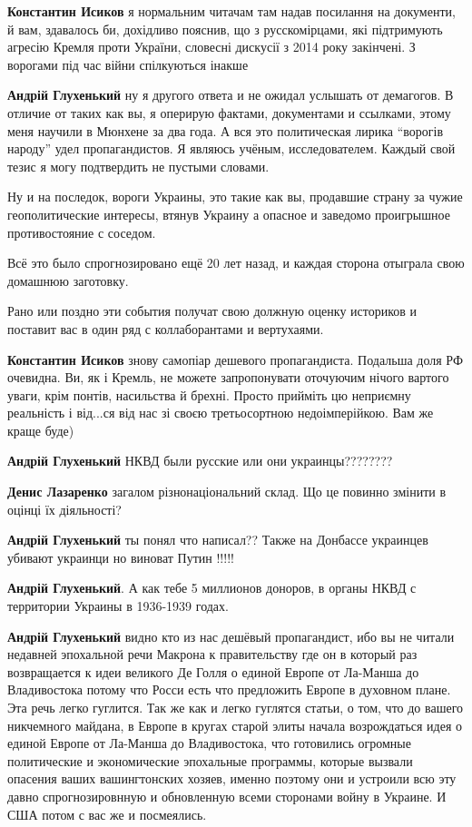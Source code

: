 \begin{itemize}
\begin{itemize}
\textbf{Константин Исиков} я нормальним читачам там надав посилання на
документи, й вам, здавалось би, дохідливо пояснив, що з русскомірцами, які
підтримують агресію Кремля проти України, словесні дискусії з 2014 року
закінчені. З ворогами під час війни спілкуються інакше


\textbf{Андрій Глухенький} ну я другого ответа и не ожидал услышать от
демагогов. В отличие от таких как вы, я оперирую фактами, документами и
ссылками, этому меня научили в Мюнхене за два года. А вся это политическая
лирика \enquote{ворогів народу} удел пропагандистов. Я являюсь учёным,
исследователем. Каждый свой тезис я могу подтвердить не пустыми словами.

Ну и на последок, вороги Украины, это такие как вы, продавшие страну за чужие
геополитические интересы, втянув Украину а опасное и заведомо проигрышное
противостояние с соседом.

Всё это было спрогнозировано ещё 20 лет назад, и каждая сторона отыграла свою
домашнюю заготовку.

Рано или поздно эти события получат свою должную оценку историков и поставит
вас в один ряд с коллаборантами и вертухаями.


\textbf{Константин Исиков} знову самопіар дешевого пропагандиста. Подальша доля РФ
очевидна. Ви, як і Кремль, не можете запропонувати оточуючим нічого вартого
уваги, крім понтів, насильства й брехні. Просто прийміть цю неприємну
реальність і від...ся від нас зі своєю третьосортною недоімперійкою. Вам же
краще буде)

\textbf{Андрій Глухенький} НКВД были русские или они украинцы????????

\textbf{Денис Лазаренко} загалом різнонаціональний склад. Що це повинно змінити в оцінці їх діяльності?

\textbf{Андрій Глухенький} ты понял что написал?? Также на Донбассе украинцев убивают украинци но виноват Путин !!!!!

\textbf{Андрій Глухенький}. А как тебе 5 миллионов доноров, в органы НКВД с территории Украины в 1936-1939 годах.


\textbf{Андрій Глухенький} видно кто из нас дешёвый пропагандист, ибо вы не
читали недавней эпохальной речи Макрона к правительству где он в который раз
возвращается к идеи великого Де Голля о единой Европе от Ла-Манша до
Владивостока потому что Росси есть что предложить Европе в духовном плане. Эта
речь легко гуглится. Так же как и легко гуглятся статьи, о том, что до вашего
никчемного майдана, в Европе в кругах старой элиты начала возрождаться идея о
единой Европе от Ла-Манша до Владивостока, что готовились огромные политические
и экономические эпохальные программы, которые вызвали опасения ваших
вашингтонских хозяев, именно поэтому они и устроили всю эту давно
спрогнозировнную и обновленную всеми сторонами войну в Украине. И США потом с
вас же и посмеялись.


\end{itemize}
\end{itemize}
